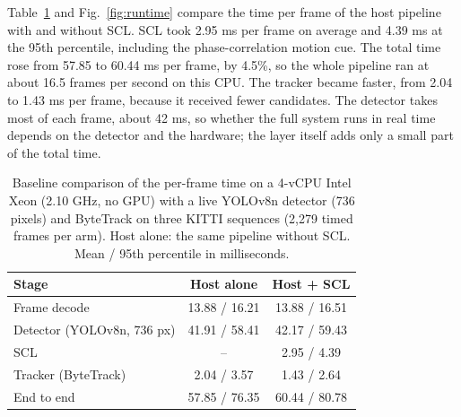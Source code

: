 \documentclass[pdflatex,sn-mathphys-num]{sn-jnl}
\newcommand{\scl}{SCL}
\begin{document}
Table~\ref{tab:runtime} and Fig.~\ref{fig:runtime} compare the time per frame
of the host pipeline with and without \scl{}. \scl{} took 2.95 ms per
frame on average and 4.39 ms at the 95th percentile, including the
phase-correlation motion cue. The total time rose from 57.85 to 60.44 ms
per frame, by 4.5\%, so the whole pipeline ran at about 16.5 frames per second
on this CPU. The tracker became faster, from 2.04 to 1.43 ms per frame,
because it received fewer candidates. The detector takes most of each frame,
about 42 ms, so whether the full system runs in real time depends on the
detector and the hardware; the layer itself adds only a small part of the
total time.

\begin{table}[t]
\caption{Baseline comparison of the per-frame time on a 4-vCPU Intel Xeon
(2.10 GHz, no GPU) with a live YOLOv8n detector (736 pixels) and ByteTrack on
three KITTI sequences (2,279 timed frames per arm). Host alone: the same
pipeline without \scl{}. Mean / 95th percentile in milliseconds.}
\label{tab:runtime}
\centering\footnotesize
\setlength{\tabcolsep}{4pt}
\begin{tabular}{@{}lcc@{}}
\toprule
Stage & Host alone & Host + \scl{}\\
\midrule
Frame decode & 13.88 / 16.21 & 13.88 / 16.51\\
Detector (YOLOv8n, 736 px) & 41.91 / 58.41 & 42.17 / 59.43\\
\scl{} & -- & 2.95 / 4.39\\
Tracker (ByteTrack) & 2.04 / 3.57 & 1.43 / 2.64\\
End to end & 57.85 / 76.35 & 60.44 / 80.78\\
\bottomrule
\end{tabular}
\end{table}
\end{document}
